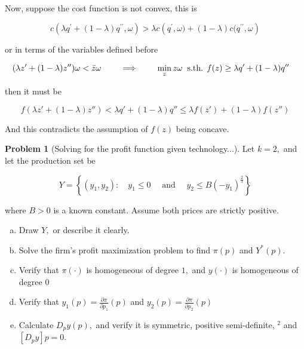 \documentclass{article}
\theoremstyle{definition}
\newtheorem{problem}{Problem}
\newcommand{\qiq}{\qquad \implies \qquad}
\begin{document}
Now, suppose the cost function is not convex, this is 

$$c\left(\lambda q^{\prime}+(1-\lambda) q^{\prime \prime}, \omega\right) > \lambda c\left(q^{\prime}, \omega)+(1-\lambda) c(q^{\prime \prime}, \omega\right)$$

or in terms of the variables defined before

\begin{align*}
    (\lambda z' + (1-\lambda)z'')\omega < \Bar{z}\omega &\qiq \min_{z} z \omega\: \text{ s.th. } f(z)\geq \lambda q' + (1-\lambda)q''
\end{align*}

then it must be

$$f(\lambda z' + (1-\lambda)z'') < \lambda q' + (1-\lambda)q'' \leq \lambda f(z') + (1-\lambda)f(z'')$$

And this contradicts the assumption of $f(z)$ being concave.

\begin{problem}[Solving for the profit function given technology...]

Let $k=2,$ and let the production set be

$$
Y=\left\{\left(y_{1}, y_{2}\right): \quad y_{1} \leq 0 \quad \text { and } \quad y_{2} \leq B\left(-y_{1}\right)^{\frac{2}{3}}\right\}
$$

where $B>0$ is a known constant. Assume both prices are strictly positive.

\begin{enumerate}[(a)]
    \item Draw $Y,$ or describe it clearly.
    \item Solve the firm's profit maximization problem to find $\pi(p)$ and $Y^{*}(p)$.
    \item Verify that $\pi(\cdot)$ is homogeneous of degree $1,$ and $y(\cdot)$ is homogeneous of degree 0
    \item Verify that $y_{1}(p)=\frac{\partial \pi}{\partial p_{1}}(p)$ and $y_{2}(p)=\frac{\partial \pi}{\partial p_{2}}(p)$
    \item Calculate $D_{p} y(p),$ and verify it is symmetric, positive semi-definite, $^{2}$ and $\left[D_{p} y\right] p=0$.
\end{enumerate}

\end{problem}
\end{document}
